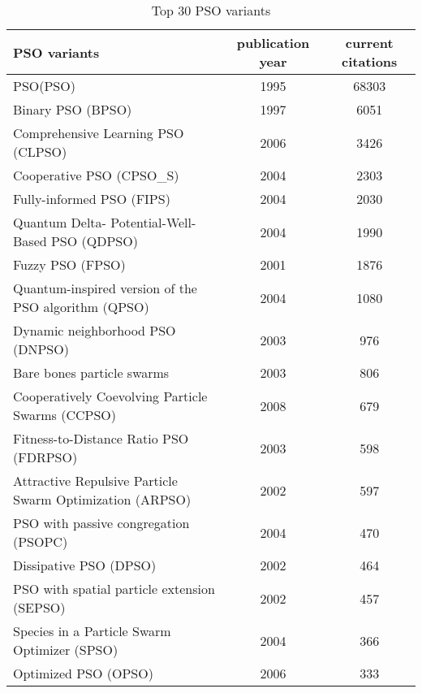 
\begin{table}[H]\centering
\caption{Top 30 PSO variants}\label{tab:pso_variants }
\scriptsize
\begin{tabular}{lcc}\toprule
\textbf{PSO variants} &\textbf{publication year} &\textbf{current citations} \\\midrule
PSO(PSO) &1995 &68303 \\
Binary PSO (BPSO) &1997 &6051 \\
Comprehensive Learning PSO (CLPSO) &2006 &3426 \\
Cooperative PSO (CPSO\_S) &2004 &2303 \\
Fully-informed PSO (FIPS) &2004 &2030 \\
Quantum Delta- Potential-Well-Based PSO (QDPSO) &2004 &1990 \\
Fuzzy PSO (FPSO) &2001 &1876 \\
Quantum-inspired version of the PSO algorithm (QPSO) &2004 &1080 \\
Dynamic neighborhood PSO (DNPSO) &2003 &976 \\
Bare bones particle swarms &2003 &806 \\
Cooperatively Coevolving Particle Swarms (CCPSO) &2008 &679 \\
Fitness-to-Distance Ratio PSO (FDRPSO) &2003 &598 \\
Attractive Repulsive Particle Swarm Optimization (ARPSO) &2002 &597 \\
PSO with passive congregation (PSOPC) &2004 &470 \\
Dissipative PSO (DPSO) &2002 &464 \\
PSO with spatial particle extension (SEPSO) &2002 &457 \\
Species in a Particle Swarm Optimizer (SPSO) &2004 &366 \\
Optimized PSO (OPSO) &2006 &333 \\

\end{tabular}
\end{table}
